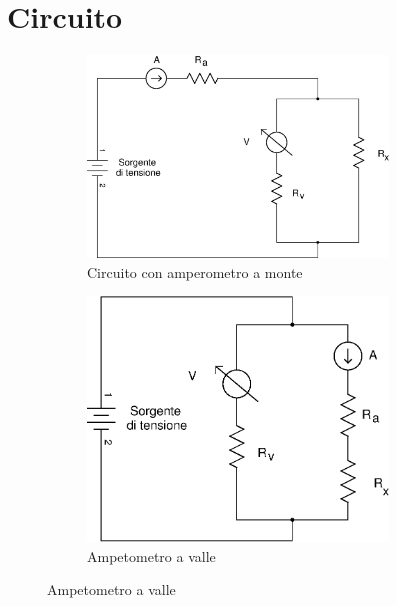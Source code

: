 \section*{Circuito}

\begin{figure}[h]
  \centering
  \begin{subfigure}[b]{0.45\textwidth}
    \includegraphics[width=8cm]{monte.eps}
    \caption{Circuito con amperometro a monte}
    \label{fig:monte}
  \end{subfigure}
  \qquad
  \begin{subfigure}[b]{0.45\textwidth}
    \includegraphics[width=8cm]{valle.eps}
    \caption{Ampetometro a valle}
    \label{fig:valle}
  \end{subfigure}
\end{figure}
